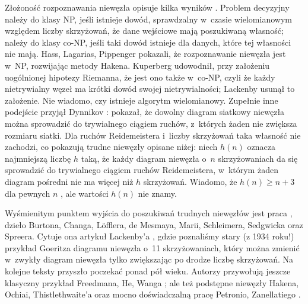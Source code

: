 Złożoność rozpoznawania niewęzła opisuje kilka wyników \cite[problem 1.76]{baykur2026}.
Problem decyzyjny należy do klasy NP, jeśli istnieje dowód, sprawdzalny w~czasie wielomianowym względem liczby skrzyżowań, że dane wejściowe mają poszukiwaną własność; należy do klasy co-NP, jeśli taki dowód istnieje dla danych, które tej własności nie mają.
Hass, Lagarias, Pippenger \cite{hass1999} pokazali, że rozpoznawanie niewęzła jest w~NP, rozwijając metody Hakena.
Kuperberg \cite{kuperberg2014} udowodnił, przy założeniu uogólnionej hipotezy Riemanna, że jest ono także w~co-NP, czyli że każdy nietrywialny węzeł ma krótki dowód swojej nietrywialności; Lackenby \cite{lackenby2021} usunął to założenie.
%
%
%
%
Nie wiadomo, czy istnieje algorytm wielomianowy.
Zupełnie inne podejście przyjął Dynnikov \cite{dynnikov2006}: pokazał, że dowolny diagram siatkowy niewęzła można sprowadzić do trywialnego ciągiem ruchów, z~których żaden nie zwiększa rozmiaru siatki.
%
Dla ruchów Reidemeistera i~liczby skrzyżowań taka własność nie zachodzi, co pokazują trudne niewęzły opisane niżej: niech $h(n)$ oznacza najmniejszą liczbę $h$ taką, że każdy diagram niewęzła o~$n$ skrzyżowaniach da się sprowadzić do trywialnego ciągiem ruchów Reidemeistera, w~którym żaden diagram pośredni nie ma więcej niż $h$ skrzyżowań.
Wiadomo, że $h(n) \ge n + 3$ dla pewnych $n$ \cite{schleimer2021}, ale wartości $h(n)$ nie znamy.

Wyśmienitym punktem wyjścia do poszukiwań trudnych niewęzłów jest praca \cite{schleimer2021}, dzieło Burtona, Changa, Löfflera, de Mesmaya, Marii, Schleimera, Sedgwicka oraz Spreera.
%
%
%
%
%
%
%
%
Cytuje ona artykuł Lackenby'a \cite{lackenby2015}, gdzie poznaliśmy stary (z 1934 roku!) przykład Goeritza \cite{goeritz1934} diagramu niewęzła o~11 skrzyżowaniach, który można zmienić w~zwykły diagram niewęzła tylko zwiększając po drodze liczbę skrzyżowań.
%
%
Na kolejne teksty przyszło poczekać ponad pół wieku.
Autorzy przywołują jeszcze klasyczny przykład Freedmana, He, Wanga \cite{freedman1994}; ale też podstępne niewęzły Hakena, Ochiai, Thistlethwaite'a oraz mocno doświadczalną pracę Petronio, Zanellatiego \cite{zanellati2016}.
%
%
%
%
%
%

